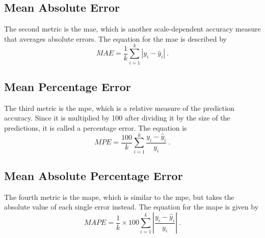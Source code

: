 \subsection*{Mean Absolute Error}

The second metric is the \gls{mae}, which is another scale-dependent accuracy measure that averages absolute errors. The equation for the \gls{mae} is described by\\

\begin{equation}
MAE = \frac{1}{k} \sum_{i=1}^{k} \left|y_i-\hat{y}_i\right|~.
\end{equation}

\subsection*{Mean Percentage Error}

The third metric is the \gls{mpe}, which is a relative measure of the prediction accuracy. Since it is multiplied by 100 after dividing it by the size of the predictions, it is called a percentage error. The equation is\\

\begin{equation}
MPE = \frac{100}{k} \sum_{i=1}^{k} \frac{y_i-\hat{y}_i}{y_i}~.
\end{equation}

\subsection*{Mean Absolute Percentage Error}

The fourth metric is the \gls{mape}, which is similar to the \gls{mpe}, but takes the absolute value of each single error instead. The equation for the \gls{mape} is given by\\

\begin{equation}
MAPE = \frac{1}{k}\times 100 \sum_{i=1}^{k} \left|\frac{y_i-\hat{y}_i}{y_i}\right|~.
\label{eq:mape}
\end{equation}






%
%
%

